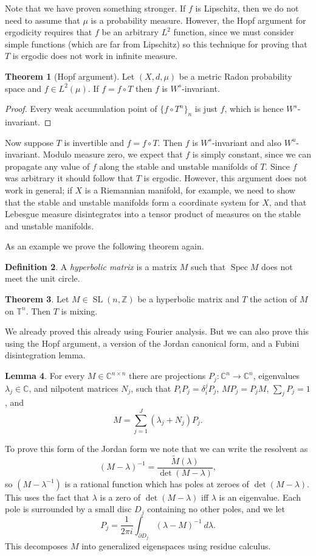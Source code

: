 \documentclass[12pt]{report}
\newcommand{\ZZ}{\mathbb{Z}}
\newcommand{\CC}{\mathbb{C}}
\newcommand{\TT}{\mathbb{T}}
\newcommand{\SL}{\operatorname{SL}}
\newcommand{\Spec}{\operatorname{Spec}}
\newcommand{\dfn}[1]{\emph{#1}\index{#1}}
\theoremstyle{definition}
\newtheorem{theorem}{Theorem}[chapter]
\newtheorem{lemma}[theorem]{Lemma}
\newtheorem{definition}[theorem]{Definition}
\begin{document}
Note that we have proven something stronger. If $f$ is Lipschitz, then we do not need to assume that $\mu$ is a probability measure. However, the Hopf argument for ergodicity requires that $f$ be an arbitrary $L^2$ function, since we must consider simple functions (which are far from Lipschitz) so this technique for proving that $T$ is ergodic does not work in infinite measure.
\begin{theorem}[Hopf argument]
Let $(X, d, \mu)$ be a metric Radon probability space and $f \in L^2(\mu)$. If $f = f \circ T$ then $f$ is $W^s$-invariant.
\end{theorem}
\begin{proof}
Every weak accumulation point of $\{f \circ T^n\}_n$ is just $f$, which is hence $W^s$-invariant.
\end{proof}
Now suppose $T$ is invertible and $f = f \circ T$. Then $f$ is $W^s$-invariant and also $W^u$-invariant. Modulo measure zero, we expect that $f$ is simply constant, since we can propagate any value of $f$ along the stable and unstable manifolds of $T$. Since $f$ was arbitrary it should follow that $T$ is ergodic. However, this argument does not work in general; if $X$ is a Riemannian manifold, for example, we need to show that the stable and unstable manifolds form a coordinate system for $X$, and that Lebesgue measure disintegrates into a tensor product of measures on the stable and unstable manifolds.

As an example we prove the following theorem again.
\begin{definition}
A \dfn{hyperbolic matrix} is a matrix $M$ such that $\Spec M$ does not meet the unit circle.
\end{definition}
\begin{theorem}
Let $M \in \SL(n, \ZZ)$ be a hyperbolic matrix and $T$ the action of $M$ on $\TT^n$. Then $T$ is mixing.
\end{theorem}
We already proved this already using Fourier analysis. But we can also prove this using the Hopf argument, a version of the Jordan canonical form, and a Fubini disintegration lemma.
\begin{lemma}
For every $M \in \CC^{n \times n}$ there are projections $P_j: \CC^n \to \CC^n $, eigenvalues $\lambda_j \in \CC$, and nilpotent matrices $N_j$, such that $P_iP_j = \delta_i^jP_j$, $MP_j = P_jM$, $\sum_j P_j = 1$, and
$$M = \sum_{j=1}^J (\lambda_j + N_j)P_j.$$
\end{lemma}
To prove this form of the Jordan form we note that we can write the resolvent as
$$(M - \lambda)^{-1} = \frac{\tilde M(\lambda)}{\det(M-\lambda)},$$
so $(M - \lambda^{-1})$ is a rational function which has poles at zeroes of $\det(M - \lambda)$. This uses the fact that $\lambda$ is a zero of $\det(M - \lambda)$ iff $\lambda$ is an
eigenvalue. Each pole is surrounded by a small disc $D_j$ containing no other poles, and we let
$$P_j = \frac{1}{2\pi i} \int_{\partial D_j} (\lambda - M)^{-1} ~d\lambda.$$
This decomposes $M$ into generalized eigenspaces using residue calculus.
\end{document}
